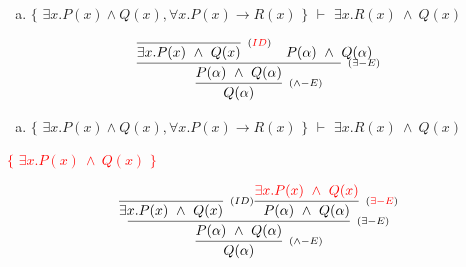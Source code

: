 \documentclass[aspectratio=43]{beamer}
\begin{document}
    \begin{frame}[fragile]
    
    	\begin{enumerate}[d)]
			\item $\{$ $\exists x.P(x)\land Q(x), \forall x.P(x)\to R(x)$ $\}$ $\vdash$ $\exists x.R(x)\ \land\ Q(x) $\\
		\end{enumerate}
        
        \vspace{80pt}
        
        \[
        \begin{array}{c}
		
        	\infer[_{(\land -E)}] 
                	{Q(\alpha)}
                    {\infer[_{(\exists -E)}]
                    	{P(\alpha)\ \land \ Q(\alpha)}
                    	{\infer[_{(\textcolor{red}{ID})}]
                        	{\exists x.P(x)\ \land \ Q(x)}
                            {}
                        \hspace{10pt}
                        P(\alpha)\ \land \ Q(\alpha)
                        }
                    }
		\end{array}
        \]
        
	\end{frame}
    
     \begin{frame}[fragile]
    
    	\begin{enumerate}[d)]
			\item $\{$ $\exists x.P(x)\land Q(x), \forall x.P(x)\to R(x)$ $\}$ $\vdash$ $\exists x.R(x)\ \land\ Q(x) $\\
		\end{enumerate}
        \textcolor{red}{$\{$ $\exists x.P(x)\ \land \ Q(x)$ $\}$}
        \vspace{80pt}
        
        \[
        \begin{array}{c}
		
        	\infer[_{(\land -E)}] 
                	{Q(\alpha)}
                    {\infer[_{(\exists -E)}]
                    	{P(\alpha)\ \land \ Q(\alpha)}
                    	{\infer[_{(ID)}]
                        	{\exists x.P(x)\ \land \ Q(x)}
                            {}
                        \infer[_{(\textcolor{red}{\exists -E})}] 
                        	{P(\alpha)\ \land \ Q(\alpha)}
                            {\textcolor{red}{\exists x.P(x)\ \land \ Q(x)}}
                        }
                    }
		\end{array}
        \]
        
	\end{frame}
        
\end{document}

